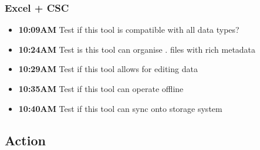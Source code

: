 \documentclass{article}
\begin{document}
\subsubsection{Excel + CSC}
\begin{itemize}
\item \textbf{10:09AM} Test if this tool is compatible with all data types?
\item \textbf{10:24AM} Test is this tool can organise . files with rich metadata
\item \textbf{10:29AM} Test if this tool allows for editing data
\item \textbf{10:35AM} Test if this tool can operate offline
\item \textbf{10:40AM} Test if this tool can sync onto storage system
\end{itemize}



\subsection{Action}
\end{document}
